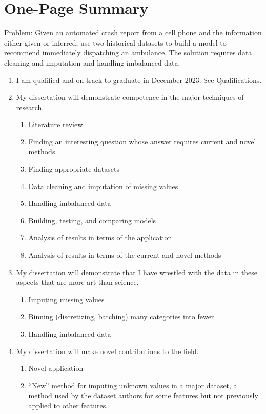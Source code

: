 \section*{One-Page Summary}

Problem:  Given an automated crash report from a cell phone and the information either given or inferred, use two historical datasets to build a model to recommend immediately dispatching an ambulance.  The solution requires data cleaning and imputation and handling imbalanced data.

\begin{enumerate}
	\item I am qualified and on track to graduate in December 2023.  See \hyperref[sec:Qualifications]{Qualifications}.
	\item My dissertation will demonstrate competence in the major techniques of research.
	\begin{enumerate}[label=\alph*.]
		\item Literature review
		\item Finding an interesting question whose answer requires current and novel methods
		\item Finding appropriate datasets
		\item Data cleaning and imputation of missing values
		\item Handling imbalanced data
		\item Building, testing, and comparing models
		\item Analysis of results in terms of the application
		\item Analysis of results in terms of the current and novel methods
	\end{enumerate}
	\item My dissertation will demonstrate that I have wrestled with the data in these aspects that are more art than science.
	\begin{enumerate}[label=\alph*.]
		\item Imputing missing values
		\item Binning (discretizing, batching) many categories into fewer
		\item Handling imbalanced data
	\end{enumerate}
	\item My dissertation will make novel contributions to the field.
	\begin{enumerate}[label=\alph*.]
		\item Novel application
		\item ``New'' method for imputing unknown values in a major dataset, a method used by the dataset authors for some features but not previously applied to other features.  

\end{enumerate}
\end{enumerate}
